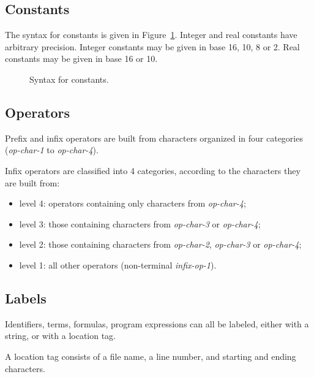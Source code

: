 \subsection{Constants}
The syntax for constants is given in Figure~\ref{fig:bnf:constant}.
Integer and real constants have arbitrary precision.
Integer constants may be given in base 16, 10, 8 or 2.
Real constants may be given in base 16 or 10.

\begin{figure}
\begin{center}\framebox{}\end{center}
  \caption{Syntax for constants.}
\label{fig:bnf:constant}
\end{figure}

\subsection{Operators}

Prefix and infix operators are built from characters organized in four
categories (\textsl{op-char-1} to \textsl{op-char-4}).
\begin{center}\framebox{}\end{center}
Infix operators are classified into 4 categories, according to the
characters they are built from:
\begin{itemize}
\item level 4: operators containing only characters from
\textit{op-char-4};
\item level 3: those containing
 characters from \textit{op-char-3} or \textit{op-char-4};
\item level 2: those containing
 characters from \textit{op-char-2}, \textit{op-char-3} or
 \textit{op-char-4};
\item level 1: all other operators (non-terminal \textit{infix-op-1}).
\end{itemize}

\subsection{Labels}

Identifiers, terms, formulas, program expressions
can all be labeled, either with a string, or with a location tag.
\begin{center}\framebox{}\end{center}
A location tag consists of a file name, a line number, and starting
and ending characters.

